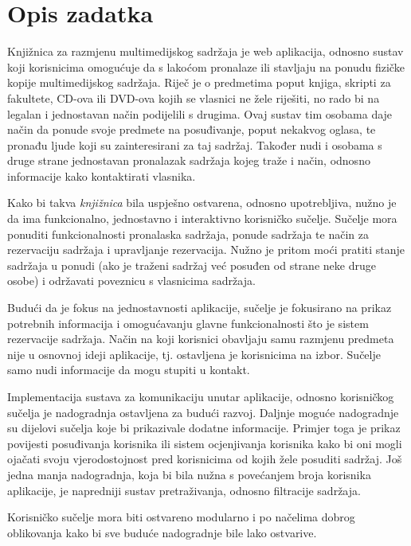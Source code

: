 \documentclass[times, utf8, zavrsni, numeric]{fer}
\newcommand{\razmakp}{\vspace{18pt}}
\begin{document}
\section{Opis zadatka}

Knjižnica za razmjenu multimedijskog sadržaja je web aplikacija, odnosno sustav koji korisnicima omogućuje da s lakoćom pronalaze ili stavljaju na ponudu fizičke kopije multimedijskog sadržaja.
Riječ je o predmetima poput knjiga, skripti za fakultete, CD-ova ili DVD-ova kojih se vlasnici ne žele riješiti, no rado bi na legalan i jednostavan način podijelili s drugima.
Ovaj sustav tim osobama daje način da ponude svoje predmete na posuđivanje, poput nekakvog oglasa, te pronađu ljude koji su zainteresirani za taj sadržaj.
Također nudi i osobama s druge strane jednostavan pronalazak sadržaja kojeg traže i način, odnosno informacije kako kontaktirati vlasnika.

\razmakp

Kako bi takva \emph{knjižnica} bila uspješno ostvarena, odnosno upotrebljiva, nužno je da ima funkcionalno, jednostavno i interaktivno korisničko sučelje.
Sučelje mora ponuditi funkcionalnosti pronalaska sadržaja, ponude sadržaja te način za rezervaciju sadržaja i upravljanje rezervacija.
Nužno je pritom moći pratiti stanje sadržaja u ponudi (ako je traženi sadržaj već posuđen od strane neke druge osobe) i održavati poveznicu s vlasnicima sadržaja.

Budući da je fokus na jednostavnosti aplikacije, sučelje je fokusirano na prikaz potrebnih informacija i omogućavanju glavne funkcionalnosti što je sistem rezervacije sadržaja.
Način na koji korisnici obavljaju samu razmjenu predmeta nije u osnovnoj ideji aplikacije, tj. ostavljena je korisnicima na izbor.
Sučelje samo nudi informacije da mogu stupiti u kontakt.

\razmakp

Implementacija sustava za komunikaciju unutar aplikacije, odnosno korisničkog sučelja je nadogradnja ostavljena za budući razvoj.
Daljnje moguće nadogradnje su dijelovi sučelja koje bi prikazivale dodatne informacije.
Primjer toga je prikaz povijesti posuđivanja korisnika ili sistem ocjenjivanja korisnika kako bi oni mogli ojačati svoju vjerodostojnost pred korisnicima od kojih žele posuditi sadržaj.
Još jedna manja nadogradnja, koja bi bila nužna s povećanjem broja korisnika aplikacije, je napredniji sustav pretraživanja, odnosno filtracije sadržaja.

Korisničko sučelje mora biti ostvareno modularno i po načelima dobrog oblikovanja kako bi sve buduće nadogradnje bile lako ostvarive.
\end{document}
